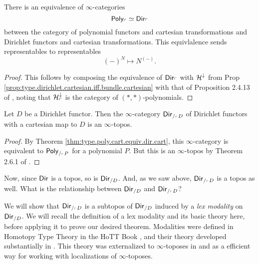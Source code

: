 \begin{thm}\label{thm:type.poly.cart.equiv.dir.cart}
  There is an equivalence of $\infty$-categories
  $$\mathsf{{Poly}}_{\ulcorner} \simeq \operatorname{\mathsf{{Dir}}}_{\ulcorner}$$
  between the category of polynomial functors and cartesian transformations and
  Dirichlet functors and cartesian transformations. This equivlalence sends
  representables to representables
  $$(-)^N \mapsto N^{(-)}.$$
\end{thm}
\begin{proof}
This follows by composing the equivalence of $\operatorname{\mathsf{{Dir}}}_{\ulcorner}$ with
$\operatorname{\mathcal{H}}^{\mathbin{\downarrow}}$ from Prop
\ref{prop:type.dirichlet.cartesian.iff.bundle.cartesian} with that of
Proposition 2.4.13 of \cite{GHK:Analytic.Monads}, noting that
$\operatorname{\mathcal{H}}^{\mathbin{\downarrow}}_{\ulcorner}$ is the category of $(\ast,\ast)$-polynomials. 
\end{proof}

\begin{cor}
  Let $D$ be a Dirichlet functor. Then the $\infty$-category
  $\operatorname{\mathsf{{Dir}}}_{/_{\ulcorner} D}$
  of Dirichlet functors with a cartesian map to $D$ is an $\infty$-topos.
\end{cor}
\begin{proof}
By Theorem \ref{thm:type.poly.cart.equiv.dir.cart}, this $\infty$-category is equivalent
to $\mathsf{{Poly}}_{/_{\ulcorner} P}$ for a polynomial $P$. But this is an
$\infty$-topos by Theorem 2.6.1 of \cite{GHK:Analytic.Monads}.
\end{proof}

Now, since $\operatorname{\mathsf{{Dir}}}$ is a topos, so is $\operatorname{\mathsf{{Dir}}}_{/D}$. And, as we saw above,
$\operatorname{\mathsf{{Dir}}}_{/_{\ulcorner} D}$ is a topos as well. What is the relationship between
$\operatorname{\mathsf{{Dir}}}_{/D}$ and $\operatorname{\mathsf{{Dir}}}_{/_{\ulcorner} D}$?

We will show that $\operatorname{\mathsf{{Dir}}}_{/_{\ulcorner} D}$ is a subtopos of $\operatorname{\mathsf{{Dir}}}_{/D}$ induced
by a \emph{lex modality} on $\operatorname{\mathsf{{Dir}}}_{/D}$. We will recall the definition of a lex
modality and its basic theory here, before applying it to prove our desired
theorem. Modalities were defined in Homotopy Type Theory in the HoTT Book
\cite{UFP:HoTT.Book}, and their theory developed substantially in
\cite{RSS:Modalities.in.HoTT}. This theory was externalized to
$\infty$-toposes in \cite{ABFJ:Blakers.Massey} and \cite{ABFJ:Goodwillie} as a
efficient way for working with localizations of $\infty$-toposes.

